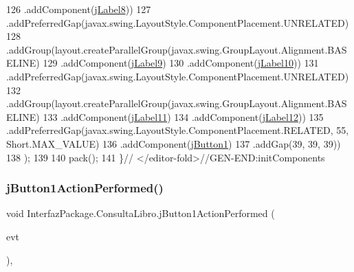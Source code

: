 \begin{DoxyCode}
126                     .addComponent(\mbox{\hyperlink{class_interfaz_package_1_1_consulta_libro_afc512066b447316ce167de196273232f}{jLabel8}}))
127                 .addPreferredGap(javax.swing.LayoutStyle.ComponentPlacement.UNRELATED)
128                 .addGroup(layout.createParallelGroup(javax.swing.GroupLayout.Alignment.BASELINE)
129                     .addComponent(\mbox{\hyperlink{class_interfaz_package_1_1_consulta_libro_ae312eda737e35580e0221ddbd8c17292}{jLabel9}})
130                     .addComponent(\mbox{\hyperlink{class_interfaz_package_1_1_consulta_libro_aa72af154332185cfbed0dec73bd34450}{jLabel10}}))
131                 .addPreferredGap(javax.swing.LayoutStyle.ComponentPlacement.UNRELATED)
132                 .addGroup(layout.createParallelGroup(javax.swing.GroupLayout.Alignment.BASELINE)
133                     .addComponent(\mbox{\hyperlink{class_interfaz_package_1_1_consulta_libro_ae94f652b20072c79107b06192a514608}{jLabel11}})
134                     .addComponent(\mbox{\hyperlink{class_interfaz_package_1_1_consulta_libro_a22c3d5f2c9bebc19190d3eb57195b720}{jLabel12}}))
135                 .addPreferredGap(javax.swing.LayoutStyle.ComponentPlacement.RELATED, 55, Short.MAX\_VALUE)
136                 .addComponent(\mbox{\hyperlink{class_interfaz_package_1_1_consulta_libro_a690d079d1efa9d0a7efd0cce09c7f375}{jButton1}})
137                 .addGap(39, 39, 39))
138         );
139 
140         pack();
141     \}\textcolor{comment}{// </editor-fold>//GEN-END:initComponents}
\end{DoxyCode}
\mbox{\label{class_interfaz_package_1_1_consulta_libro_a043c35370f2e4eefae07c77fda717bf7}} 
\subsubsection{\texorpdfstring{j\+Button1\+Action\+Performed()}{jButton1ActionPerformed()}}
{\footnotesize\ttfamily void Interfaz\+Package.\+Consulta\+Libro.\+j\+Button1\+Action\+Performed (\begin{DoxyParamCaption}\item[{java.\+awt.\+event.\+Action\+Event}]{evt }\end{DoxyParamCaption})\hspace{0.3cm}{\ttfamily [inline]}, {\ttfamily [private]}}


